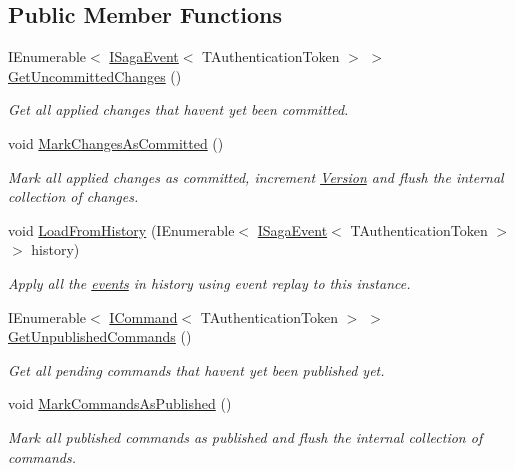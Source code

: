 \subsection*{Public Member Functions}
\begin{DoxyCompactItemize}
\item 
I\+Enumerable$<$ \hyperlink{interfaceCqrs_1_1Events_1_1ISagaEvent}{I\+Saga\+Event}$<$ T\+Authentication\+Token $>$ $>$ \hyperlink{interfaceCqrs_1_1Domain_1_1ISaga_abb77811b4f7d19adb61f9d33da18e7e0_abb77811b4f7d19adb61f9d33da18e7e0}{Get\+Uncommitted\+Changes} ()
\begin{DoxyCompactList}\small\item\em Get all applied changes that haven\textquotesingle{}t yet been committed. \end{DoxyCompactList}\item 
void \hyperlink{interfaceCqrs_1_1Domain_1_1ISaga_a85c75f80bc5be4bad7f1d9f1231bfba7_a85c75f80bc5be4bad7f1d9f1231bfba7}{Mark\+Changes\+As\+Committed} ()
\begin{DoxyCompactList}\small\item\em Mark all applied changes as committed, increment \hyperlink{interfaceCqrs_1_1Domain_1_1ISaga_a83a02ff45543d670356dde4149cdc614_a83a02ff45543d670356dde4149cdc614}{Version} and flush the internal collection of changes. \end{DoxyCompactList}\item 
void \hyperlink{interfaceCqrs_1_1Domain_1_1ISaga_a2714804684bc65cf4dec79b4697b9b21_a2714804684bc65cf4dec79b4697b9b21}{Load\+From\+History} (I\+Enumerable$<$ \hyperlink{interfaceCqrs_1_1Events_1_1ISagaEvent}{I\+Saga\+Event}$<$ T\+Authentication\+Token $>$$>$ history)
\begin{DoxyCompactList}\small\item\em Apply all the \hyperlink{}{events} in {\itshape history}  using event replay to this instance. \end{DoxyCompactList}\item 
I\+Enumerable$<$ \hyperlink{interfaceCqrs_1_1Commands_1_1ICommand}{I\+Command}$<$ T\+Authentication\+Token $>$ $>$ \hyperlink{interfaceCqrs_1_1Domain_1_1ISaga_abba76d72857107a14328c8b555f3883f_abba76d72857107a14328c8b555f3883f}{Get\+Unpublished\+Commands} ()
\begin{DoxyCompactList}\small\item\em Get all pending commands that haven\textquotesingle{}t yet been published yet. \end{DoxyCompactList}\item 
void \hyperlink{interfaceCqrs_1_1Domain_1_1ISaga_a4ce7c6cb939b5d6a5afb7538da3d1680_a4ce7c6cb939b5d6a5afb7538da3d1680}{Mark\+Commands\+As\+Published} ()
\begin{DoxyCompactList}\small\item\em Mark all published commands as published and flush the internal collection of commands. \end{DoxyCompactList}\end{DoxyCompactItemize}
